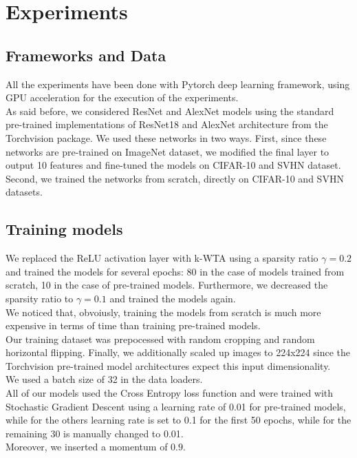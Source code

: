 \documentclass[a4paper]{article}
\begin{document}
	\section{Experiments}
	\subsection{Frameworks and Data}
	All the experiments have been done with Pytorch deep learning framework, using GPU acceleration for the execution of the experiments.\\
	As said before, we considered ResNet and AlexNet models using the standard pre-trained implementations of ResNet18 and AlexNet architecture from the Torchvision package. We used these networks in two ways. First, since these networks are pre-trained on ImageNet dataset, we modified the final layer to output 10 features and fine-tuned the models on CIFAR-10 and SVHN dataset. Second, we trained the networks from scratch, directly on CIFAR-10 and SVHN datasets.
	
	\subsection{Training models}
	We replaced the ReLU activation layer with k-WTA using a sparsity ratio $\gamma = 0.2$ and trained the models for several epochs: 80 in the case of models trained from scratch, 10 in the case of pre-trained models. Furthermore, we decreased the sparsity ratio to $\gamma = 0.1$ and trained the models again.\\
	We noticed that, obvoiusly, training the models from scratch is much more expensive in terms of time than training pre-trained models.\\
	Our training dataset was prepocessed with random cropping and random horizontal flipping. Finally, we additionally scaled up images to 224x224 since the Torchvision pre-trained model architectures expect this input dimensionality.\\
	We used a batch size of 32 in the data loaders.\\
	All of our models used the Cross Entropy loss function and were trained with Stochastic Gradient Descent using	a learning rate of 0.01 for pre-trained models, while for the others learning rate is set to 0.1 for the first 50 epochs, while for the remaining 30 is manually changed to 0.01. \\ Moreover, we inserted a momentum of $0.9$. 
	
\end{document}
